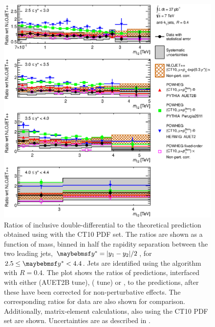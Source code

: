 \begin{figure}
  \includegraphics[width=\largefigwidth]{chapters/dijets/DijetMassYStarRatioFinal04_forward.eps}
  \caption{Ratios of inclusive \dijet double-differential \xs to the theoretical
     prediction obtained using \NLOjetpp with the CT10 PDF set. The ratios
     are shown as a function of \dijet mass, binned in half the rapidity separation
     between the two leading jets, $\yStar = |y_1 - y_2|/2$, for $2.5 \leq \yStar < 4.4$.
     Jets are identified using the \akt algorithm with $R=0.4$. The plot shows the
     ratios of \Powheg predictions, interfaced with either \Pythia (AUET2B tune), \Pythia
     ( tune) or \Herwig, to the \NLOjetpp predictions, after these have
     been corrected for non-perturbative effects. The corresponding ratios for data
     are also shown for comparison. Additionally, \Powheg matrix-element calculations,
     also using the CT10 PDF set are shown. Uncertainties are as described in
     .}
  \label{fig:dijets:PowhegRatio_akt4_forward}
\end{figure}

